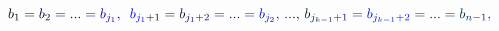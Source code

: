 \documentclass[12pt]{article}
\begin{document}
\makeatletter
\renewcommand*{\@textcolor}[3]{%
  \protect\leavevmode
  \begingroup
    \color#1{#2}#3%
  \endgroup
}
\makeatother
\begin{displaymath}
\mathcolor[RGB]{0,0,15}{b} _ { \mathcolor[RGB]{0,0,30}{1} } \mathcolor[RGB]{0,0,45}{=} \mathcolor[RGB]{0,0,60}{b} _ { \mathcolor[RGB]{0,0,75}{2} } \mathcolor[RGB]{0,0,90}{=} \mathcolor[RGB]{0,0,105}{.} \mathcolor[RGB]{0,0,120}{.} \mathcolor[RGB]{0,0,135}{.} \mathcolor[RGB]{0,0,150}{=} \mathcolor[RGB]{0,0,165}{b} _ { \mathcolor[RGB]{0,0,180}{j} _ { \mathcolor[RGB]{0,0,195}{1} } } \mathcolor[RGB]{0,0,210}{,} \, \, \, \mathcolor[RGB]{0,0,225}{b} _ { \mathcolor[RGB]{0,0,240}{j} _ { \mathcolor[RGB]{0,0,255}{1} } \mathcolor[RGB]{0,15,0}{+} \mathcolor[RGB]{0,15,15}{1} } \mathcolor[RGB]{0,15,30}{=} \mathcolor[RGB]{0,15,45}{b} _ { \mathcolor[RGB]{0,15,60}{j} _ { \mathcolor[RGB]{0,15,75}{1} } \mathcolor[RGB]{0,15,90}{+} \mathcolor[RGB]{0,15,105}{2} } \mathcolor[RGB]{0,15,120}{=} \mathcolor[RGB]{0,15,135}{.} \mathcolor[RGB]{0,15,150}{.} \mathcolor[RGB]{0,15,165}{.} \mathcolor[RGB]{0,15,180}{=} \mathcolor[RGB]{0,15,195}{b} _ { \mathcolor[RGB]{0,15,210}{j} _ { \mathcolor[RGB]{0,15,225}{2} } } \mathcolor[RGB]{0,15,240}{,} \, \mathcolor[RGB]{0,15,255}{.} \mathcolor[RGB]{0,30,0}{.} \mathcolor[RGB]{0,30,15}{.} \mathcolor[RGB]{0,30,30}{,} \mathcolor[RGB]{0,30,45}{\,
b} _ { \mathcolor[RGB]{0,30,60}{j} _ { \mathcolor[RGB]{0,30,75}{k} \mathcolor[RGB]{0,30,90}{-} \mathcolor[RGB]{0,30,105}{1} } \mathcolor[RGB]{0,30,120}{+} \mathcolor[RGB]{0,30,135}{1} } \mathcolor[RGB]{0,30,150}{=} \mathcolor[RGB]{0,30,165}{b} _ { \mathcolor[RGB]{0,30,180}{j} _ { \mathcolor[RGB]{0,30,195}{k} \mathcolor[RGB]{0,30,210}{-} \mathcolor[RGB]{0,30,225}{1} } \mathcolor[RGB]{0,30,240}{+} \mathcolor[RGB]{0,30,255}{2} } \mathcolor[RGB]{0,45,0}{=} \mathcolor[RGB]{0,45,15}{.} \mathcolor[RGB]{0,45,30}{.} \mathcolor[RGB]{0,45,45}{.} \mathcolor[RGB]{0,45,60}{=} \mathcolor[RGB]{0,45,75}{b} _ { \mathcolor[RGB]{0,45,90}{n} \mathcolor[RGB]{0,45,105}{-} \mathcolor[RGB]{0,45,120}{1} } \mathcolor[RGB]{0,45,135}{,}
\end{displaymath}
\end{document}
